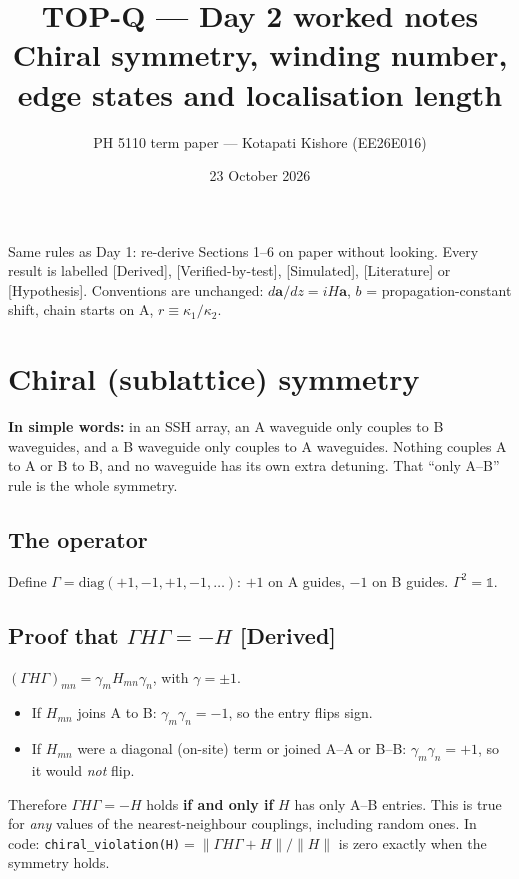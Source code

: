 \documentclass[10pt,a4paper]{article}
\title{TOP-Q --- Day 2 worked notes\\[2pt]\large Chiral symmetry, winding number, edge states and localisation length}
\author{PH 5110 term paper --- Kotapati Kishore (EE26E016)}
\date{23 October 2026}
\newcommand{\ka}{\kappa_1}
\newcommand{\kc}{\kappa_2}
\newcommand{\note}[1]{\par\smallskip\noindent\colorbox{gray!12}{\parbox{\dimexpr\linewidth-2\fboxsep}{\small #1}}\par\smallskip}
\newcommand{\evd}[1]{\textsf{\small[#1]}}
\newcommand{\simple}[1]{\par\noindent\textbf{In simple words:} #1\par\smallskip}
\begin{document}
\sloppy\maketitle

\note{Same rules as Day 1: re-derive Sections 1--6 on paper without looking. Every result is labelled
\evd{Derived}, \evd{Verified-by-test}, \evd{Simulated}, \evd{Literature} or \evd{Hypothesis}. Conventions are unchanged:
$d\bm a/dz=iH\bm a$, $b$ = propagation-constant shift, chain starts on A, $r\equiv\ka/\kc$.}

\tableofcontents

\section{Chiral (sublattice) symmetry}
\simple{in an SSH array, an A waveguide only couples to B waveguides, and a B waveguide only couples to A waveguides. Nothing couples A to A or B to B, and no waveguide has its own extra detuning. That ``only A--B'' rule is the whole symmetry.}

\subsection{The operator}
Define $\Gamma=\mathrm{diag}(+1,-1,+1,-1,\dots)$: $+1$ on A guides, $-1$ on B guides. $\Gamma^2=\mathbb 1$.

\subsection{Proof that $\Gamma H\Gamma=-H$ \evd{Derived}}
$(\Gamma H\Gamma)_{mn}=\gamma_m H_{mn}\gamma_n$, with $\gamma=\pm1$.
\begin{itemize}[itemsep=1pt]
\item If $H_{mn}$ joins A to B: $\gamma_m\gamma_n=-1$, so the entry flips sign.
\item If $H_{mn}$ were a diagonal (on-site) term or joined A--A or B--B: $\gamma_m\gamma_n=+1$, so it would \emph{not} flip.
\end{itemize}
Therefore $\Gamma H\Gamma=-H$ holds \textbf{if and only if} $H$ has only A--B entries. This is true for \emph{any} values of the nearest-neighbour couplings, including random ones. In code: \texttt{chiral\_violation(H)}$=\|\Gamma H\Gamma+H\|/\|H\|$ is zero exactly when the symmetry holds.
\end{document}

